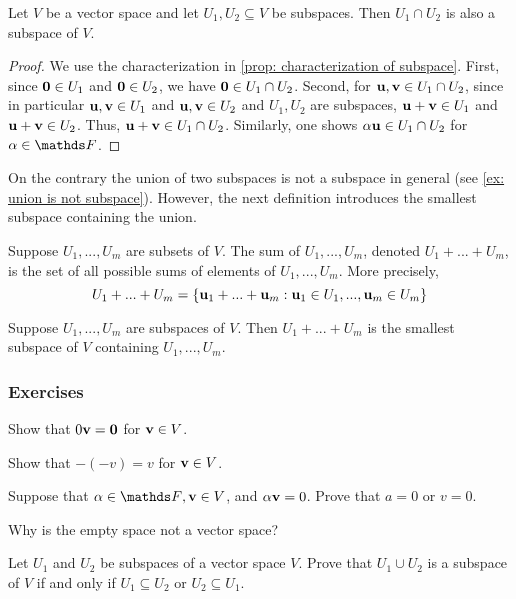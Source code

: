 \documentclass{article}
\begin{document}
\begin{proposition}
 Let $V$ be a vector space and let $U_1, U_2 \subseteq V$ be subspaces. Then $U_1 \cap U_2$ is also a subspace of $V$. 
\end{proposition}

\begin{proof}
We use the characterization in \cref{prop: characterization of subspace}. First, since ${\mathbf{0}} \in U_1$ and ${\mathbf{0}}\in U_2$, we have ${\mathbf{0}}\in U_1 \cap U_2$. Second, for ${\mathbf{u}}, {\mathbf{v}} \in U_1\cap U_2$, since in particular ${\mathbf{u}},{\mathbf{v}} \in U_1$ and ${\mathbf{u}},{\mathbf{v}} \in U_2$ and $U_1, U_2$ are subspaces, ${\mathbf{u}}+{\mathbf{v}}\in U_1$ and ${\mathbf{u}}+{\mathbf{v}}\in U_2$. Thus, ${\mathbf{u}}+{\mathbf{v}} \in U_1 \cap U_2$. Similarly, one shows $\alpha {\mathbf{u}} \in U_1\cap U_2$ for $\alpha \in \F$.
\end{proof}

On the contrary the union of two subspaces is not a subspace in general (see \cref{ex: union is not subspace}). However, the next definition introduces the smallest subspace containing the union.

\begin{definition}
Suppose $U_{1},...,U_{m}$ are subsets of $V$. The sum
of $U_{1},...,U_{m}$, denoted $U_{1}+...+U_{m}$, is the set of all
possible sums of elements of $U_{1},...,U_{m}.$ More precisely,
\[
U_{1}+...+U_{m}=\{{\mathbf{u}}_{1}+...+{\mathbf{u}}_{m}:{\mathbf{u}}_{1}\in U_{1},...,{\mathbf{u}}_{m}\in U_{m}\}
\]
\end{definition}


\begin{proposition}
Suppose $U_{1},...,U_{m}$ are subspaces of $V$. Then
$U_{1}+...+U_{m}$ is the smallest subspace of $V$ containing $U_{1},...,U_{m}$.
\end{proposition}



\subsubsection{Exercises}
\begin{exercise}
\label{ex:zero}
Show that $0 {\mathbf{v}}= {\mathbf{0}}$ for ${\mathbf{v}}\in V$.
\end{exercise}
\begin{exercise}
Show that $-(-v)=v$ for ${\mathbf{v}}\in V$.
\end{exercise}
\begin{exercise}
Suppose that $\alpha\in\F, \bv\in V$, and $\alpha {\mathbf{v}}=0$. Prove that $a=0$
or $v=0$.
\end{exercise}
\begin{exercise}
Why is the empty space not a vector space?
\end{exercise}
\begin{exercise}\label{ex: union is not subspace}
Let $U_1$ and $U_2$ be subspaces of a vector space $V$. Prove that $U_1 \cup U_2$ is a subspace of $V$ if and only if $U_1 \subseteq U_2$ or $U_2 \subseteq U_1$.
\end{exercise}
\end{document}
